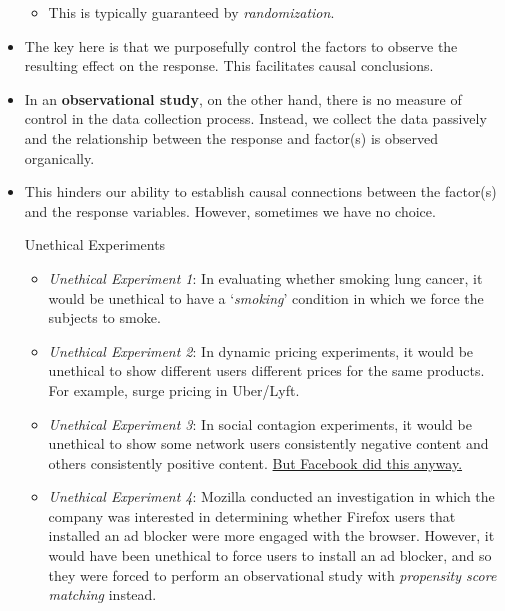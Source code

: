 \begin{itemize}
\begin{itemize}
              \item This is typically guaranteed by \emph{randomization}.
          \end{itemize}
    \item The key here is that we purposefully control the factors to
          observe the resulting effect on the response. This facilitates causal conclusions.
    \item In an \textbf{observational study}, on the other hand, there is no measure of control
          in the data collection process. Instead, we collect the data passively and
          the relationship between the response and factor(s) is observed organically.
    \item This hinders our ability to establish causal connections between the factor(s)
          and the response variables. However, sometimes we have no choice.
          \begin{Example}{Unethical Experiments}{}
              \begin{itemize}
                  \item \emph{Unethical Experiment 1}: In evaluating whether smoking lung cancer,
                        it would be unethical to have a `\emph{smoking}' condition in which we force the
                        subjects to smoke.
                  \item \emph{Unethical Experiment 2}: In dynamic pricing experiments, it would be unethical
                        to show different users different prices for the same products. For example, surge pricing
                        in Uber/Lyft.
                  \item \emph{Unethical Experiment 3}: In social contagion experiments, it would be unethical
                        to show some network users consistently negative content and others consistently positive content.
                        \href{https://slate.com/technology/2014/06/facebook-unethical-experiment-it-made-news-feeds-happier-or-sadder-to-manipulate-peoples-emotions.html}{But Facebook did this anyway.}
                  \item \emph{Unethical Experiment 4}: Mozilla conducted an investigation in which
                        the company was interested in determining whether Firefox users that installed an ad blocker
                        were more engaged with the browser. However, it would have been unethical to force users to install
                        an ad blocker, and so they were forced to perform an observational study with \emph{propensity score matching}
                        instead.
              \end{itemize}
          \end{Example}
\end{itemize}
